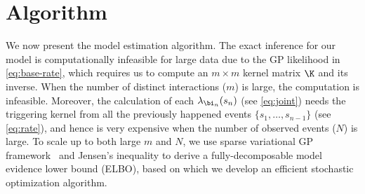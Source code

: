   
  
\section{Algorithm}
We now present the model estimation algorithm. The exact inference for our model is computationally infeasible for large data due to the GP likelihood in \eqref{eq:base-rate}, which requires us to compute an $m \times m$ kernel matrix $\K$ and its inverse. When the number of distinct interactions (\ie $m$) is large, the computation is infeasible. Moreover, the calculation of each $\lambda_{\bi_n}(s_n)$ (see \eqref{eq:joint}) needs the triggering kernel from all the previously happened events $\{s_1, \ldots, s_{n-1}\}$ (see \eqref{eq:rate}), and hence is very expensive when the number of observed events (\ie $N$) is large. To scale up to both large $m$ and $N$, we use sparse variational GP framework~\citep{titsias2009variational,hensman2013gaussian} and Jensen's inequality to derive a fully-decomposable model evidence lower bound (ELBO), based on which we develop an efficient stochastic optimization algorithm.   
	
